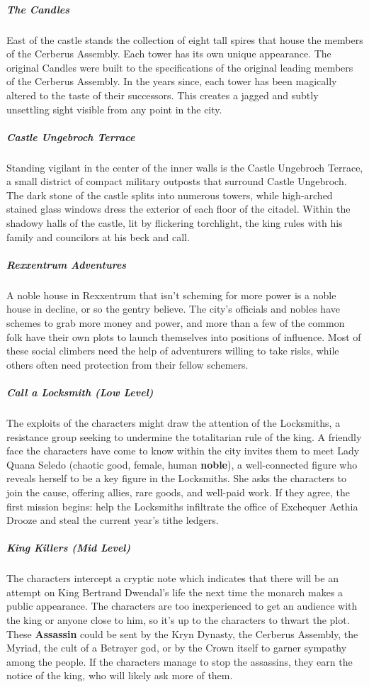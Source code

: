 \documentclass[10pt,a4paper,twoside,bg=print,twocolumn,openany,nodeprecatedcode]{dndbook}
\begin{document}
\subparagraph{The Candles}
East of the castle stands the collection of eight tall spires that house the members of the Cerberus Assembly. Each tower has its own unique appearance. The original Candles were built to the specifications of the original leading members of the Cerberus Assembly. In the years since, each tower has been magically altered to the taste of their successors. This creates a jagged and subtly unsettling sight visible from any point in the city.

\subparagraph{Castle Ungebroch Terrace}
Standing vigilant in the center of the inner walls is the Castle Ungebroch Terrace, a small district of compact military outposts that surround Castle Ungebroch. The dark stone of the castle splits into numerous towers, while high-arched stained glass windows dress the exterior of each floor of the citadel. Within the shadowy halls of the castle, lit by flickering torchlight, the king rules with his family and councilors at his beck and call.

\subparagraph{Rexxentrum Adventures}
A noble house in Rexxentrum that isn't scheming for more power is a noble house in decline, or so the gentry believe. The city's officials and nobles have schemes to grab more money and power, and more than a few of the common folk have their own plots to launch themselves into positions of influence. Most of these social climbers need the help of adventurers willing to take risks, while others often need protection from their fellow schemers.

\subparagraph{Call a Locksmith (Low Level)}
The exploits of the characters might draw the attention of the Locksmiths, a resistance group seeking to undermine the totalitarian rule of the king. A friendly face the characters have come to know within the city invites them to meet Lady Quana Seledo (chaotic good, female, human \textbf{noble}), a well-connected figure who reveals herself to be a key figure in the Locksmiths. She asks the characters to join the cause, offering allies, rare goods, and well-paid work. If they agree, the first mission begins: help the Locksmiths infiltrate the office of Exchequer Aethia Drooze and steal the current year's tithe ledgers.

\subparagraph{King Killers (Mid Level)}
The characters intercept a cryptic note which indicates that there will be an attempt on King Bertrand Dwendal's life the next time the monarch makes a public appearance. The characters are too inexperienced to get an audience with the king or anyone close to him, so it's up to the characters to thwart the plot. These \textbf{Assassin} could be sent by the Kryn Dynasty, the Cerberus Assembly, the Myriad, the cult of a Betrayer god, or by the Crown itself to garner sympathy among the people. If the characters manage to stop the assassins, they earn the notice of the king, who will likely ask more of them.
\end{document}
